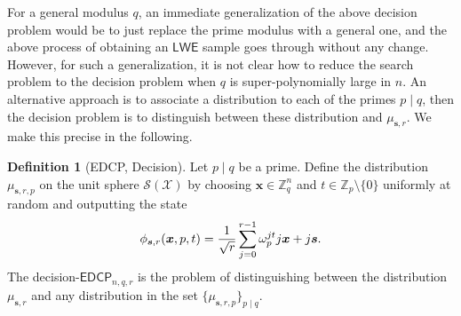 \documentclass[11pt]{article}
\theoremstyle{plain}
\theoremstyle{definition}
\newtheorem{definition}[theorem]{Definition}
\let\ket\relax
\DeclarePairedDelimiter{\ket}{\lvert}{\rangle}
\def\Z{\mathbb{Z}}
\def\lwe{\mathsf{LWE}}
\def\edcp{\mathsf{EDCP}}
\def\SX{\mathcal{S(X)}}
\begin{document}
For a general modulus $q$, an immediate generalization of the above decision problem would be to just replace the prime modulus with a general one, and the above process of obtaining an $\lwe$ sample goes through without any change. However, for such a generalization, it is not clear how to reduce the search problem to the decision problem when $q$ is super-polynomially large in $n$. An alternative approach is to associate a distribution to each of the primes $p \mid q$, then the decision problem is to distinguish between these distribution and $\mu_{\bm{s}, r}$. We make this precise in the following.

\begin{definition}[EDCP, Decision]
    Let $p \mid q$ be a prime. Define the distribution $\mu_{\bm{s}, r, p}$ on the unit sphere $\SX$ by choosing $\bm{x} \in \Z_q^n$ and $t \in \Z_p {\setminus} \{ 0 \}$ uniformly at random and outputting the state
    \begin{equation}
        \label{equ:new-dec1}
        \ket{\phi_{\bm{s}, r}(\bm{x}, p, t)} = \frac{1}{\sqrt{r}} \sum_{j = 0}^{r - 1} \omega_p^{jt} \ket{j}\ket{\bm{x} + j\bm{s}}.
    \end{equation}
    The decision-$\edcp_{n, q, r}$ is the problem of distinguishing between the distribution $\mu_{\bm{s}, r}$ and any distribution in the set $\{ \mu_{\bm{s}, r, p} \}_{p \mid q}$.
\end{definition}
\end{document}
